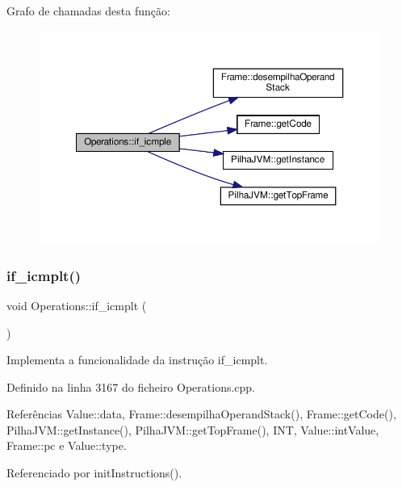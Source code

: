 Grafo de chamadas desta função\+:
\nopagebreak
\begin{figure}[H]
\begin{center}
\leavevmode
\includegraphics[width=350pt]{classOperations_a7a5736e30fcd41a1bccb71c615c4e68d_cgraph}
\end{center}
\end{figure}
\mbox{\label{classOperations_a06f624059cfada3f4a726d0482078aaa}} 
\subsubsection{\texorpdfstring{if\+\_\+icmplt()}{if\_icmplt()}}
{\footnotesize\ttfamily void Operations\+::if\+\_\+icmplt (\begin{DoxyParamCaption}{ }\end{DoxyParamCaption})\hspace{0.3cm}{\ttfamily [private]}}



Implementa a funcionalidade da instrução if\+\_\+icmplt. 



Definido na linha 3167 do ficheiro Operations.\+cpp.



Referências Value\+::data, Frame\+::desempilha\+Operand\+Stack(), Frame\+::get\+Code(), Pilha\+J\+V\+M\+::get\+Instance(), Pilha\+J\+V\+M\+::get\+Top\+Frame(), I\+NT, Value\+::int\+Value, Frame\+::pc e Value\+::type.



Referenciado por init\+Instructions().

